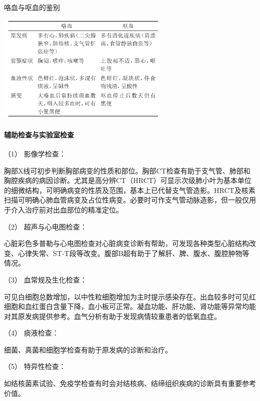 \begin{table}[htbp]
\centering
\caption{咯血与呕血的鉴别}
\label{tab9-3}
\includegraphics[width=3.26042in,height=2.05208in]{./images/Image00047.jpg}
\end{table}

\paragraph{辅助检查与实验室检查}

\hypertarget{text00024.htmlux5cux23CHP1-9-2-4-1}{}
（1） 影像学检查：

胸部X线可初步判断胸部病变的性质和部位。胸部CT检查有助于支气管、肺部和胸腔疾病的病因诊断。尤其是高分辨CT（HRCT）可显示次级肺小叶为基本单位的细微结构，可明确病变的性质及范围，基本上已代替支气管造影。HRCT及核素扫描可明确心肺血管病变及占位性病变。必要时可作支气管动脉造影，但一般仅用于介入治疗前对出血部位的精准定位。

\hypertarget{text00024.htmlux5cux23CHP1-9-2-4-2}{}
（2） 超声与心电图检查：

心脏彩色多普勒与心电图检查对心脏病变诊断有帮助，可发现各种类型心脏结构改变、心律失常、ST-T段等改变。腹部B超有助于了解肝、脾、腹水、腹腔肿物等情况。

\hypertarget{text00024.htmlux5cux23CHP1-9-2-4-3}{}
（3） 血常规及生化检查：

可见白细胞总数增加，以中性粒细胞增加为主时提示感染存在。出血较多时可见红细胞和血红蛋白含量下降，血小板可正常。凝血功能、肝功能、肾功能等异常均能对其原发病提供参考。血气分析有助于发现病情较重患者的低氧血症。

\hypertarget{text00024.htmlux5cux23CHP1-9-2-4-4}{}
（4） 痰液检查：

细菌、真菌和细胞学检查有助于原发病的诊断和治疗。

\hypertarget{text00024.htmlux5cux23CHP1-9-2-4-5}{}
（5） 特异性检查：

如结核菌素试验、免疫学检查有时会对结核病、结缔组织疾病的诊断具有重要参考价值。

